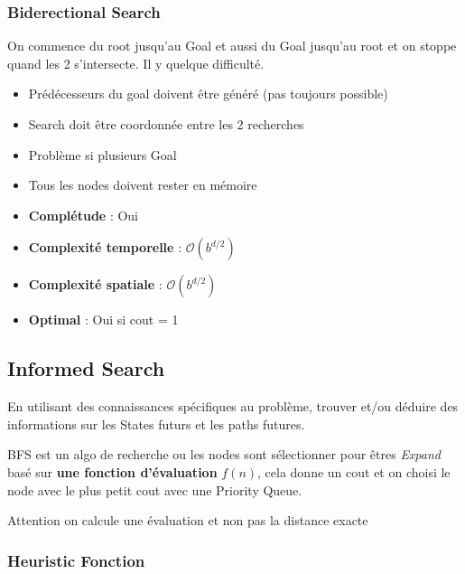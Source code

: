 		
		\subsubsection{Biderectional Search}
			On commence du root jusqu'au Goal et aussi du Goal jusqu'au root et on stoppe quand les 2 s'intersecte. Il y quelque difficulté.
			\begin{itemize}
				\item Prédécesseurs du goal doivent être généré (pas toujours possible)
				\item Search doit être coordonnée entre les 2 recherches
				\item Problème si plusieurs Goal
				\item Tous les nodes doivent rester en mémoire
			\end{itemize}
			
			\begin{itemize}
				\item \textbf{Complétude} : Oui
				\item \textbf{Complexité temporelle} : $\mathcal{O}(b^{d/2})$
				\item \textbf{Complexité spatiale} : $\mathcal{O}(b^{d/2})$
				\item \textbf{Optimal} : Oui si cout = 1
			\end{itemize}
			
	\subsection{Informed Search}
		En utilisant des connaissances spécifiques au problème, trouver et/ou déduire des informations sur les States futurs et les paths futures.
		
		BFS est un algo de recherche ou les nodes sont sélectionner pour êtres \textit{Expand} basé sur \textbf{une fonction d'évaluation} $f(n)$, cela donne un cout et on choisi le node avec le plus petit cout avec une Priority Queue.
		
		Attention on calcule une évaluation et non pas la distance exacte
		
		\subsubsection{Heuristic Fonction}
		
